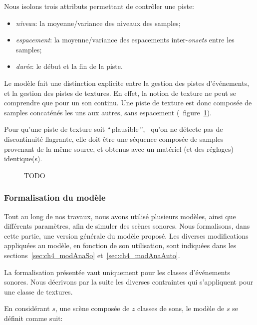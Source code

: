 Nous isolons trois attributs permettant de contrôler une piste:

\begin{itemize}
\item \emph{niveau}: la moyenne/variance des niveaux des samples;
\item \emph{espacement}: la moyenne/variance des espacements inter-\emph{onsets} entre les samples;
\item \emph{durée}: le début et la fin de la piste.
\end{itemize}

Le modèle fait une distinction explicite entre la gestion des pistes d'événements, et la gestion des pistes de textures. En effet, la notion de texture ne peut se comprendre que pour un son continu. Une piste de texture est donc composée de samples concaténés les uns aux autres, sans espacement (\cf~figure~\ref{fig:modelSequence}). 

Pour qu'une piste de texture soit ``\,plausible\,'', \ie~qu'on ne détecte pas de discontinuité flagrante, elle doit être une séquence composée de samples provenant de la même source, et obtenus avec un matériel (et des réglages) identique(s).

\begin{figure}[t]
        \graphicspath{{gfx/}}
        \myfloatalign
        \def\svgwidth{\linewidth}
        
       \caption{TODO}\label{fig:modelSequence}
\end{figure}

\subsubsection{Formalisation du modèle}
 \label{sec:ch4_modelForm}
 
 Tout au long de nos travaux, nous avons utilisé plusieurs modèles, ainsi que différents paramètres, afin de simuler des scènes sonores. Nous formalisons, dans cette partie, une version générale du modèle proposé. Les diverses modifications appliquées au modèle, en fonction de son utilisation, sont indiquées dans les sections~\ref{sec:ch4_modAnaSo} et~\ref{sec:ch4_modAnaAuto}.
 
La formalisation présentée vaut uniquement pour les classes d'événements sonores. Nous décrivons par la suite les diverses contraintes qui s'appliquent pour une classe de textures.
 
En considérant $s$, une scène composée de $z$ classes de sons, le modèle de $s$ se définit comme suit:
 
